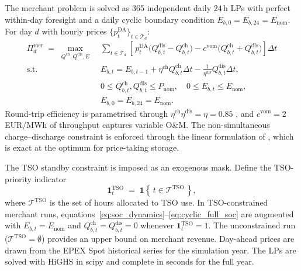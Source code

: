 The merchant problem is solved as 365 independent daily 24\,h LPs with perfect within-day foresight and a daily cyclic boundary condition $E_{b,0} = E_{b,24} = E_{\mathrm{nom}}$. For day $d$ with hourly prices $\{p_t^{\mathrm{DA}}\}_{t \in \mathcal{T}_d}$:
\begin{align}
    \Pi^{\mathrm{mer}}_d \;=\; \max_{Q^{\mathrm{ch}}, Q^{\mathrm{dis}}, E}\;
    & \sum_{t \in \mathcal{T}_d}\!\left[\, p_t^{\mathrm{DA}} \bigl(Q_{b,t}^{\mathrm{dis}} - Q_{b,t}^{\mathrm{ch}}\bigr)
        - c^{\mathrm{vom}}\bigl(Q_{b,t}^{\mathrm{ch}} + Q_{b,t}^{\mathrm{dis}}\bigr) \right] \Delta t
    \label{eq:merchant_obj} \\
    \text{s.t.} \quad
    & E_{b,t} = E_{b,t-1} + \eta^{\mathrm{ch}} Q_{b,t}^{\mathrm{ch}} \Delta t - \tfrac{1}{\eta^{\mathrm{dis}}} Q_{b,t}^{\mathrm{dis}} \Delta t,
    \label{eq:soc_dynamics} \\
    & 0 \leq Q_{b,t}^{\mathrm{ch}}, Q_{b,t}^{\mathrm{dis}} \leq P_{\mathrm{nom}}, \quad
      0 \leq E_{b,t} \leq E_{\mathrm{nom}},
    \label{eq:power_energy_limits}\\
    & E_{b,0} = E_{b,24} = E_{\mathrm{nom}}.
    \label{eq:cyclic_full_soc}
\end{align}
Round-trip efficiency is parametrised through $\eta^{\mathrm{ch}}\eta^{\mathrm{dis}} = \eta = 0.85$ \citep{NREL_ATB_2024}, and $c^{\mathrm{vom}} = 2$\,EUR/MWh of throughput captures variable O\&M. The non-simultaneous charge--discharge constraint is enforced through the linear formulation of \citet{Sioshansi_Estimating_the_Value_of_Storage_PJM_2009}, which is exact at the optimum for price-taking storage.
 
The TSO standby constraint is imposed as an exogenous mask. Define the TSO-priority indicator
\begin{equation}
    \mathbf{1}^{\mathrm{TSO}}_t \;=\; \mathbf{1}\!\left\{\, t \in \mathcal{T}^{\mathrm{TSO}} \,\right\},
\end{equation}
where $\mathcal{T}^{\mathrm{TSO}}$ is the set of hours allocated to TSO use. In TSO-constrained merchant runs, equations~\eqref{eq:soc_dynamics}--\eqref{eq:cyclic_full_soc} are augmented with $E_{b,t} = E_{\mathrm{nom}}$ and $Q_{b,t}^{\mathrm{ch}} = Q_{b,t}^{\mathrm{dis}} = 0$ whenever $\mathbf{1}^{\mathrm{TSO}}_t = 1$. The unconstrained run ($\mathcal{T}^{\mathrm{TSO}} = \emptyset$) provides an upper bound on merchant revenue. Day-ahead prices are drawn from the EPEX Spot historical series for the simulation year. The LPs are solved with HiGHS in scipy and complete in seconds for the full year.
 
